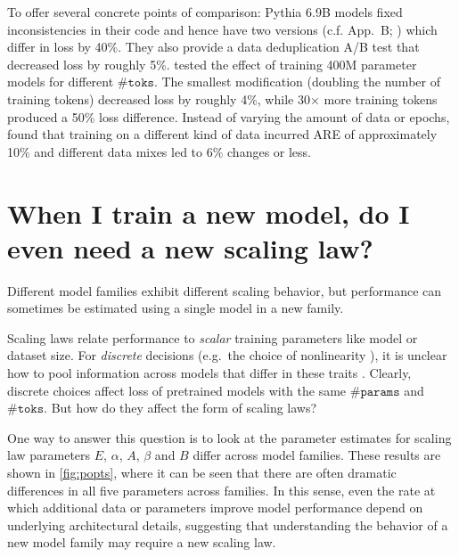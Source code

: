 \documentclass{article}
\theoremstyle{plain}
\theoremstyle{definition}
\theoremstyle{remark}
\newcommand{\mathmsize}{\#\texttt{params}}
\newcommand{\mathtokens}{\#\texttt{toks}}
\newcommand{\mathperf}{L}
\newcommand{\msize}{$\mathmsize{}$}
\newcommand{\tokens}{$\mathtokens{}$}
\newcommand{\perf}{loss}%
\newcommand{\summarybox}[1]{
  \begin{tcolorbox}[
    enhanced,
    colback=olive!8,
    colframe=olive!50,
    boxrule=0.5pt,
    left=8pt,
    right=8pt,
    top=6pt,
    bottom=6pt,
    arc=1.5mm,
    boxsep=0pt,
    fontupper=\normalfont\small\itshape,
    frame hidden,
    before skip=0pt,  %
    after skip=8pt,   %
  ]
    #1
  \end{tcolorbox}
}
\begin{document}
To offer several concrete points of comparison: Pythia 6.9B models fixed inconsistencies in their code and hence have two versions (c.f. App.~B; \citealp{pythia}) which differ in loss by 40\%. They also provide a data deduplication A/B test that decreased loss by roughly 5\%. \citet{overtrain} tested the effect of training 400M parameter models for different \tokens{}. The smallest modification (doubling the number of training tokens) decreased loss by roughly 4\%, while 30$\times$ more training tokens produced a 50\% loss difference. 
Instead of varying the amount of data or epochs, \citet{bimix} found that training on a different kind of data incurred ARE of approximately 10\% and different data mixes led to 6\% changes or less.


\section{When I train a new model, do I even need a new scaling law?}\label{sec:transfer}%

\summarybox{Different model families exhibit different scaling behavior, but performance can sometimes be estimated using a single model in a new family.}



Scaling laws relate performance to \emph{scalar} training parameters like model or dataset size. 
For \emph{discrete} decisions (e.g.\ the choice of nonlinearity%
), it is unclear how to pool information across models that differ in these traits
 \citep[see][for concurrent work that performs this pooling based on downstream task behavior]{ruan2024observational,polo2024sloth}. 
 Clearly, discrete choices affect \perf{} of pretrained models with the same \msize{} and \tokens{}. 
But how do they affect the form of scaling laws? 

One way to answer this question is to look at the parameter estimates for scaling law parameters $E$, $\alpha$, $A$, $\beta$ and $B$ differ across model families. These results are shown in \cref{fig:popts}, where it can be seen that there are often dramatic differences in all five parameters across families. In this sense, even the rate at which additional data or parameters improve model performance depend on underlying architectural details, suggesting that understanding the behavior of a new model family may require a new scaling law.
\end{document}
